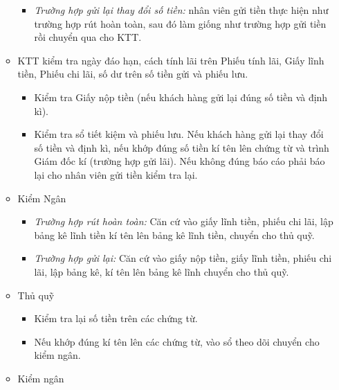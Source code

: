 \documentclass{article}
\begin{document}
\begin{enumerate}
\begin{itemize}
\begin{itemize}
							\item \textit{Trường hợp gửi lại thay đổi số tiền:} nhân viên gửi tiền thực hiện như trường hợp rút hoàn toàn, sau đó làm giống như trường hợp gửi tiền rồi chuyển qua cho KTT.
						\end{itemize}
						
					\item KTT kiểm tra ngày đáo hạn, cách tính lãi trên Phiếu tính lãi, Giấy lĩnh tiền, Phiếu chi lãi, số dư trên số tiền gửi và phiếu lưu.
					
						\begin{itemize}
							\item Kiểm tra Giấy nộp tiền (nếu khách hàng gửi lại đúng số tiền và định kì).
							
							\item Kiểm tra sổ tiết kiệm và phiếu lưu. Nếu khách hàng gửi lại thay đổi số tiền và định kì, nếu khớp đúng số tiền kí tên lên chứng từ và trình Giám đốc kí (trường hợp gửi lãi). Nếu không đúng báo cáo phải báo lại cho nhân viên gửi tiền kiểm tra lại.
						\end{itemize}
						
					\item Kiểm Ngân
					
						\begin{itemize}
							\item \textit{Trường hợp rút hoàn toàn:} Căn cứ vào giấy lĩnh tiền, phiếu chi lãi, lập bảng kê lĩnh tiền kí tên lên bảng kê lĩnh tiền, chuyển cho thủ quỹ.
							
							\item \textit{Trường hợp gửi lại:} Căn cứ vào giấy nộp tiền, giấy lĩnh tiền, phiếu chi lãi, lập bảng kê, kí tên lên bảng kê lĩnh chuyển cho thủ quỹ.
						\end{itemize}
					
					\item Thủ quỹ
					
						\begin{itemize}
							\item Kiểm tra lại số tiền trên các chứng từ.
							\item Nếu khớp đúng kí tên lên các chứng từ, vào sổ theo dõi chuyển cho kiểm ngân.
						\end{itemize}
					
					\item Kiểm ngân
					

\end{itemize}
\end{enumerate}
\end{document}
